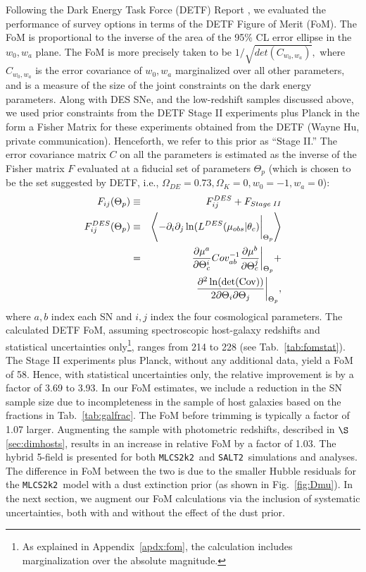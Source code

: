 \documentclass[preprint2]{aastex}    %
\newcommand{\mlcs}{{\tt MLCS2k2}}
\newcommand{\salt}{{\tt SALT2}}
\begin{document}
Following the Dark Energy Task Force (DETF) Report \citep{alb06},
we evaluated the
performance of survey options in terms of the DETF Figure of Merit (FoM).
The FoM is proportional to the inverse of the area of the 95\% CL
error ellipse in the $w_0,w_a$ plane.
The FoM is more precisely taken to be
$1/\sqrt{det(C_{w_0,w_a})},$ where $C_{w_0,w_a}$ is the error
covariance of $w_0,w_a$ marginalized over all other parameters,
and is a measure of the size of the joint constraints on the dark
energy parameters. Along with DES SNe, and the low-redshift samples 
discussed above, we used
prior constraints from the DETF Stage II experiments plus Planck in the form a Fisher Matrix for these
experiments obtained from the DETF (Wayne Hu, private communication). Henceforth, 
we refer to this prior as ``Stage II.''
The error covariance matrix $C$ on all the parameters
is estimated as the inverse of the Fisher matrix $F$ evaluated at a
fiducial set of parameters $\Theta_p$ (which is chosen to be the set
suggested by DETF, i.e., $\Omega_{DE}= 0.73, \Omega_K = 0, w_0=-1, w_a =0$):
\begin{eqnarray}
F_{ij} (\Theta_p ) &\equiv&  F_{ij}^{DES} +F_{Stage\;II}\nonumber\\
F_{ij}^{DES}(\Theta_p) &\equiv& \left\langle -\partial_i \partial_j 
\ln(L^{DES}(\mu_{obs}\vert\theta_c)\bigg\vert_{\Theta_p} \right\rangle\nonumber\\ 
                & = & \frac{\partial \mu^{a}}{\partial 
\Theta_c^{i}}Cov^{-1}_{ab}\frac{\partial \mu^{b}}{\partial \Theta_c^{j}}\bigg\vert_{\Theta_p} +\nonumber\\
&&\frac{\partial^2\ln(\rm{det} (Cov))}{2\partial \Theta_i\partial\Theta_j}\bigg\vert_{\Theta_p},
\label{eqn:fisher}
\end{eqnarray}
where $a,b$ index each SN and $i,j$ index the four cosmological parameters.
The calculated DETF FoM, assuming spectroscopic host-galaxy redshifts and 
statistical uncertainties only\footnote{As explained in 
Appendix~\ref{apdx:fom}, the calculation includes marginalization 
over the absolute magnitude.},
ranges from 214 to 228 (see Tab.~\ref{tab:fomstat}).  
The Stage II experiments plus Planck, without any additional data, yield 
a FoM of 58. Hence, with statistical uncertainties only, the relative 
improvement is by a factor of 3.69 to 3.93. 
In our FoM estimates, we include a reduction in the SN sample 
size due to incompleteness in the sample of host galaxies based on the fractions in Tab.~\ref{tab:galfrac}.
The FoM before trimming is typically a factor of 1.07 larger.
Augmenting the sample with photometric redshifts,  
described in $\S$\ref{sec:dimhosts}, results in an 
increase in relative FoM by a factor of 1.03.
The hybrid 5-field is presented for both \mlcs\ and \salt\ 
simulations and analyses. The difference in FoM between the two is 
due to the smaller Hubble residuals for the \mlcs\ model 
with a dust extinction prior (as shown in Fig.~\ref{fig:Dmu}). 
In the next section, we augment our FoM calculations via the inclusion of systematic
uncertainties, both with and without the effect of the dust prior.  
\end{document}
